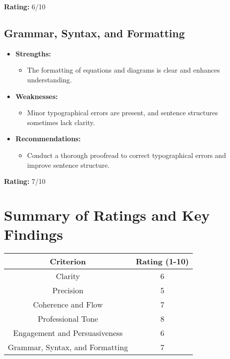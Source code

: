\documentclass{article}
\begin{document}
\textbf{Rating:} 6/10

\subsection{Grammar, Syntax, and Formatting}
\begin{itemize}
    \item \textbf{Strengths:}
    \begin{itemize}
        \item The formatting of equations and diagrams is clear and enhances understanding.
    \end{itemize}

    \item \textbf{Weaknesses:}
    \begin{itemize}
        \item Minor typographical errors are present, and sentence structures sometimes lack clarity.
    \end{itemize}

    \item \textbf{Recommendations:}
    \begin{itemize}
        \item Conduct a thorough proofread to correct typographical errors and improve sentence structure.
    \end{itemize}
\end{itemize}

\textbf{Rating:} 7/10

\section{Summary of Ratings and Key Findings}

\begin{center}
\begin{tabular}{|c|c|}
\hline
\textbf{Criterion} & \textbf{Rating (1-10)} \\
\hline
Clarity & 6 \\
Precision & 5 \\
Coherence and Flow & 7 \\
Professional Tone & 8 \\
Engagement and Persuasiveness & 6 \\
Grammar, Syntax, and Formatting & 7 \\
\hline
\end{tabular}
\end{center}
\end{document}
